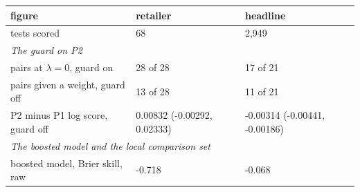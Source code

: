 \begin{tabular}{lll}
\toprule
figure & retailer & headline \\
\midrule
tests scored & 68 & 2,949 \\
\midrule
\multicolumn{3}{l}{\emph{The guard on P2}} \\
pairs at $\lambda = 0$, guard on & 28 of 28 & 17 of 21 \\
pairs given a weight, guard off & 13 of 28 & 11 of 21 \\
P2 minus P1 log score, guard off & 0.00832 (-0.00292, 0.02333) & -0.00314 (-0.00441, -0.00186) \\
\midrule
\multicolumn{3}{l}{\emph{The boosted model and the local comparison set}} \\
boosted model, Brier skill, raw & -0.718 & -0.068 \\

\end{tabular}
